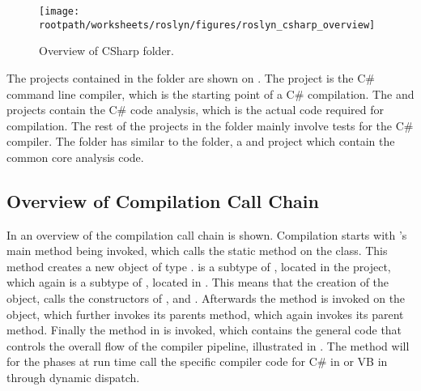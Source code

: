 \begin{figure}[htbp]
\centering
 \texttt{[image: \\rootpath/worksheets/roslyn/figures/roslyn\_csharp\_overview]} 
 \caption{Overview of CSharp folder.}
\label{fig:roslyn_csharp_overview}
\end{figure}

The projects contained in the  folder are shown on . The  project is the C\# command line compiler, which is the starting point of a C\# compilation. The  and  projects contain the C\# code analysis, which is the actual code required for compilation. The rest of the projects in the  folder mainly involve tests for the C\# compiler. The  folder has similar to the  folder, a   and  project which contain the common core analysis code.

\subsection{Overview of Compilation Call Chain}\label{ssec:overview_chain}
In  an overview of the compilation call chain is shown. Compilation starts with 's main method being invoked, which calls the static  method on the  class. This method creates a new  object of type .  is a subtype of , located in the  project, which again is a subtype of , located in . This means that the creation of the  object, calls the constructors of ,  and . Afterwards the  method is invoked on the  object, which further invokes its parents  method, which again invokes its parent  method. Finally the  method in  is invoked, which contains the general code that controls the overall flow of the compiler pipeline, illustrated in . The  method will for the phases at run time call the specific compiler code for C\# in  or \ac{VB} in  through dynamic dispatch.

